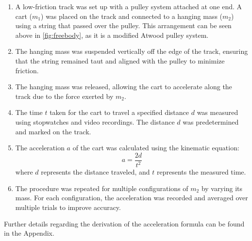 ﻿\documentclass[reprint,amsmath,amssymb,aps]{revtex4-2}
\begin{document}
\begin{enumerate}
    \item A low-friction track was set up with a pulley system attached at one end. A cart ($m_1$) was placed on the track and connected to a hanging mass ($m_2$) using a string that passed over the pulley. This arrangement can be seen above in \cref{fig:freebody}, as it is a modified Atwood pulley system.
    \item The hanging mass was suspended vertically off the edge of the track, ensuring that the string remained taut and aligned with the pulley to minimize friction.
    \item The hanging mass was released, allowing the cart to accelerate along the track due to the force exerted by $m_2$.
    \item The time $t$ taken for the cart to travel a specified distance $d$ was measured using stopwatches and video recordings. The distance $d$ was predetermined and marked on the track.
    \item The acceleration $a$ of the cart was calculated using the kinematic equation:
\begin{equation}
a = \frac{2d}{t^2}
\end{equation}
    where $d$ represents the distance traveled, and $t$ represents the measured time.
    \item The procedure was repeated for multiple configurations of $m_2$ by varying its mass. For each configuration, the acceleration was recorded and averaged over multiple trials to improve accuracy.
\end{enumerate}

Further details regarding the derivation of the acceleration formula can be found in the Appendix.

%
%
%
%
%
%
%
\end{document}
